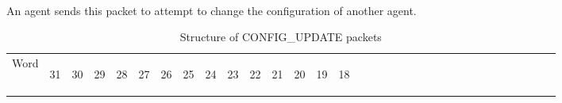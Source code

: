 \documentclass[11pt]{article}
\begin{document}
\paragraph{}
An agent sends this packet to attempt to change the configuration of another agent.
\newline
\begin{table}[h!]
    \centering
    \caption{Structure of CONFIG\_UPDATE packets}
    \label{tab:configUpdateDef}
    \begin{tabular}{|p{1cm}|m{0.04cm}|m{0.04cm}|m{0.04cm}|m{0.04cm}|m{0.04cm}|m{0.04cm}|m{0.04cm}|m{0.04cm}|m{0.04cm}|
        m{0.04cm}|m{0.04cm}|m{0.04cm}|m{0.04cm}|m{0.04cm}|m{0.04cm}|m{0.04cm}|m{0.04cm}|m{0.04cm}|m{0.04cm}|m{0.04cm}|
        m{0.04cm}|m{0.04cm}|m{0.04cm}|m{0.04cm}|m{0.04cm}|m{0.04cm}|m{0.04cm}|m{0.04cm}|m{0.04cm}|m{0.04cm}|m{0.04cm}|m{0.04cm}|}
        \hline
        Word & 
        \begin{sideways}31\end{sideways} &
        \begin{sideways}30\end{sideways} & 
        \begin{sideways}29\end{sideways} &
        \begin{sideways}28\end{sideways} &
        \begin{sideways}27\end{sideways} &
        \begin{sideways}26\end{sideways} &
        \begin{sideways}25\end{sideways} &
        \begin{sideways}24\end{sideways} &
        \begin{sideways}23\end{sideways} &
        \begin{sideways}22\end{sideways} &
        \begin{sideways}21\end{sideways} &
        \begin{sideways}20\end{sideways} &
        \begin{sideways}19\end{sideways} &
        \begin{sideways}18\end{sideways} &

\end{tabular}
\end{table}
\end{document}
